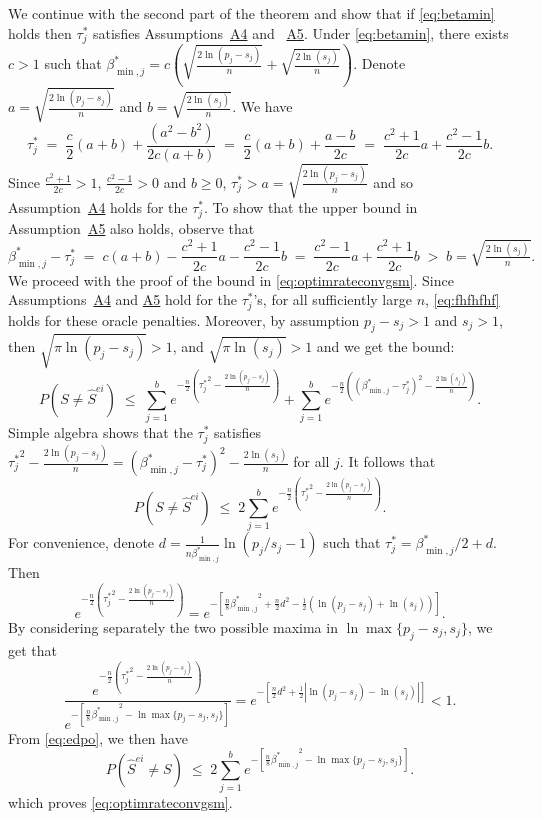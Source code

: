 \documentclass[
  12pt]{article}
\begin{document}
We continue with the second part of the theorem and show that if \eqref{eq:betamin} holds then $\tau^*_j$ satisfies Assumptions~\hyperlink{lab:A4}{A4} and ~\hyperlink{lab:A5}{A5}. Under \eqref{eq:betamin}, there exists $c>1$ such that $\beta^*_{\min,j}=c(\sqrt{\tfrac{2\ln(p_j-s_j)}{n}} + \sqrt{\tfrac{2\ln(s_j)}{n}})$. Denote $a=\sqrt{\tfrac{2\ln(p_j-s_j)}{n}}$ and $b=\sqrt{\tfrac{2\ln(s_j)}{n}}$. We have
$$
\tau_j^*\;=\;\frac{c}{2} (a+b)+\frac{(a^2-b^2)}{2c(a+b)}\;=\;\frac{c}{2} (a+b)+\frac{a-b}{2c}\;=\;\frac{c^2+1}{2c}a+\frac{c^2-1}{2c}b.
$$
Since $\tfrac{c^2+1}{2c}> 1$, $\tfrac{c^2-1}{2c}> 0$ and $b \geq 0$, $\tau^*_j>a=\sqrt{\tfrac{2\ln(p_j-s_j)}{n}}$ and so Assumption~\hyperlink{lab:A4}{A4} holds for the $\tau^*_j$. To show that the upper bound in Assumption~\hyperlink{lab:A5}{A5} also holds, observe that
$$
\beta_{\min,j}^* - \tau^*_j \;=\; c(a+b)- \frac{c^2+1}{2c}a-\frac{c^2-1}{2c}b \;= \; \frac{c^2-1}{2c}a+\frac{c^2+1}{2c}b\;>\;  b=\sqrt{\tfrac{2\ln(s_j)}{n}}.
$$
We proceed with the proof of the bound in \eqref{eq:optimrateconvgsm}. Since Assumptions~\hyperlink{lab:A4}{A4} and \hyperlink{lab:A5}{A5} hold for the $\tau^*_j$'s, for all sufficiently large $n$, \eqref{eq:fhfhfhf} holds for these oracle penalties. Moreover, by assumption $p_j-s_j>1$ and $s_j>1$, then $\sqrt{\pi\ln(p_j-s_j)}>1$, and $\sqrt{\pi\ln(s_j)}>1$ and we get the bound:
$$P(S\neq \hat{S}^{ei}) \; \leq\;\sum_{j=1}^be^{-\tfrac{n}{2}\left({\tau^*_j}^2-\tfrac{2\ln(p_j-s_j)}{n}\right)}+\sum_{j=1}^be^{-\tfrac{n}{2}\left((\beta^*_{\min,j}-\tau^*_j)^2-\tfrac{2\ln(s_j)}{n}\right)}.$$
Simple algebra shows that the $\tau_j^*$ satisfies ${\tau_j^*}^2-\tfrac{2\ln(p_j-s_j)}{n}=(\beta^*_{\min,j}-{\tau_j^*})^2-\tfrac{2\ln(s_j)}{n}$ for all $j$. It follows that
\begin{equation}\label{eq:edpo}
P(S\neq \hat{S}^{ei}) \; \leq\;2\sum_{j=1}^be^{-\tfrac{n}{2}\left({\tau^*_j}^2-\tfrac{2\ln(p_j-s_j)}{n}\right)}.
\end{equation}
For convenience, denote $d = \frac{1}{n \beta_{\min,j}^*} \ln (p_j / s_j-1)$ such that $\tau^*_j= \beta_{\min,j}^*/2 + d$. Then
$$e^{-\frac{n}{2}\left({\tau^*_j}^2-\frac{2\ln(p_j-s_j)}{n}\right)}
=e^{-\left[\frac{n}{8}{\beta_{\min,j}^*}^2+\frac{n}{2}d^2 - \frac{1}{2}\left(\ln (p_j- s_j)+\ln (s_j)\right) \right]}.$$
By considering separately the two possible maxima in $\ln \max\{p_j-s_j,s_j\}$, we get that
$$\frac{e^{-\frac{n}{2}\left({\tau^*_j}^2-\frac{2\ln(p_j-s_j)}{n}\right)}}{e^{-[\frac{n}{8}{\beta_{\min,j}^*}^2-\ln \max\{p_j-s_j,s_j\}]}}= 
e^{-\left[\frac{n}{2}d^2 + \frac{1}{2}\left|\ln (p_j- s_j)-\ln (s_j)\right|\right]} <1.$$
From \eqref{eq:edpo}, we then have
$$P(\hat{S}^{ei} \neq S) \; \leq \; 2 \sum_{j=1}^be^{-[\frac{n}{8}{\beta^*_{\min,j}}^2-\ln \max\{p_j-s_j,s_j\}]}.$$
which proves \eqref{eq:optimrateconvgsm}.
\end{document}
